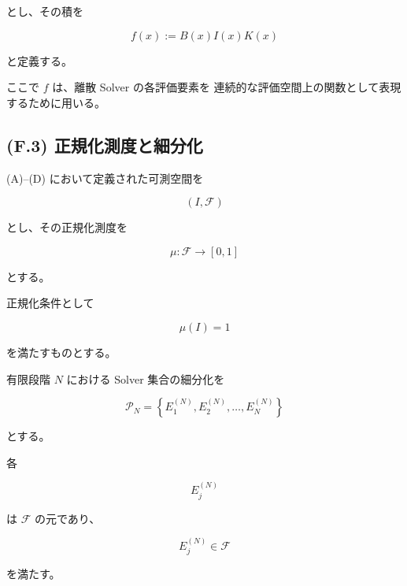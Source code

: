 \documentclass[a4paper,11pt]{article}
\begin{document}
とし、その積を

\begin{equation}
    f(x)
    :=
    B(x)I(x)K(x)
    \label{eq:F-integrand}
\end{equation}

と定義する。

ここで $f$ は、離散 Solver の各評価要素を
連続的な評価空間上の関数として表現するために用いる。


\subsection{(F.3) 正規化測度と細分化}
\label{subsec:F3}

(A)--(D) において定義された可測空間を

\begin{equation}
    (I,\mathcal{F})
\end{equation}

とし、その正規化測度を

\begin{equation}
    \mu:\mathcal{F}\to[0,1]
\end{equation}

とする。

正規化条件として

\begin{equation}
    \mu(I)=1
    \label{eq:F-measure-normalization}
\end{equation}

を満たすものとする。

有限段階 $N$ における Solver 集合の細分化を

\begin{equation}
    \mathcal{P}_N
    =
    \left\{
        E_1^{(N)},
        E_2^{(N)},
        \ldots,
        E_N^{(N)}
    \right\}
    \label{eq:F-partition}
\end{equation}

とする。

各

\begin{equation}
    E_j^{(N)}
\end{equation}

は $\mathcal{F}$ の元であり、

\begin{equation}
    E_j^{(N)}\in\mathcal{F}
\end{equation}

を満たす。
\end{document}

